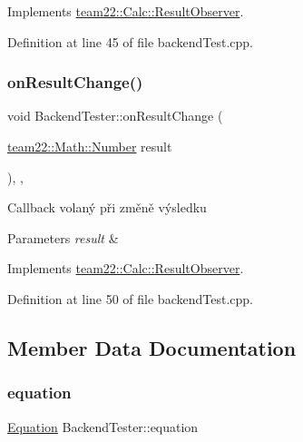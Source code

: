 Implements \hyperlink{classteam22_1_1_calc_1_1_result_observer_ad36cf8df89853d60f91094800c01d329}{team22\+::\+Calc\+::\+Result\+Observer}.



Definition at line 45 of file backend\+Test.\+cpp.

\mbox{\label{class_backend_tester_af84da1816cef621e57c65a01aa26d66e}} 
\subsubsection{\texorpdfstring{on\+Result\+Change()}{onResultChange()}}
{\footnotesize\ttfamily void Backend\+Tester\+::on\+Result\+Change (\begin{DoxyParamCaption}\item[{\hyperlink{classteam22_1_1_math_1_1_number}{team22\+::\+Math\+::\+Number}}]{result }\end{DoxyParamCaption})\hspace{0.3cm}{\ttfamily [inline]}, {\ttfamily [override]}, {\ttfamily [virtual]}}

Callback volaný při změně výsledku 
\begin{DoxyParams}{Parameters}
{\em result} & \\
\hline
\end{DoxyParams}


Implements \hyperlink{classteam22_1_1_calc_1_1_result_observer_aa04007df3aa8a499c3a511f549238285}{team22\+::\+Calc\+::\+Result\+Observer}.



Definition at line 50 of file backend\+Test.\+cpp.



\subsection{Member Data Documentation}
\mbox{\label{class_backend_tester_a72e182a9a678f3c9dc6daf2bb8afb711}} 
\subsubsection{\texorpdfstring{equation}{equation}}
{\footnotesize\ttfamily \hyperlink{classteam22_1_1_calc_1_1_equation}{Equation} Backend\+Tester\+::equation}



